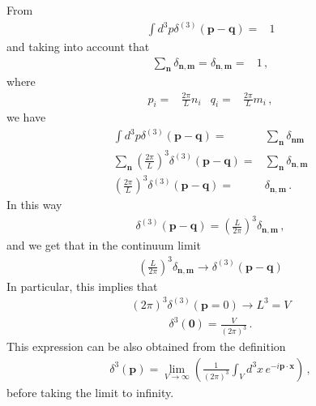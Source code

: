\begin{frame}
From
\begin{align}
  \int d^3p \delta^{(3)}(\mathbf{p}-\mathbf{q})=&1
\end{align}
and taking into account that
\begin{align}
  \sum_{\mathbf{n}} \delta_{\mathbf{n}, \mathbf{m}}=\delta_{\mathbf{n}, \mathbf{m}}=&1\,,
\end{align}
where
\begin{align}
  p_i=&\frac{2\pi}{L}n_i & q_i=&\frac{2\pi}{L}m_i\,,
\end{align}
we have
\begin{align}
  \int d^3p \delta^{(3)}(\mathbf{p}-\mathbf{q})=&\sum_{\mathbf{n}} \delta_{\mathbf{n}\mathbf{m}}\nonumber\\
 \sum_{\mathbf{n}} \left(\frac{2\pi}{L}\right)^3\delta^{(3)}(\mathbf{p}-\mathbf{q})=&\sum_{\mathbf{n}} \delta_{\mathbf{n}, \mathbf{m}}\nonumber\\
  \left(\frac{2\pi}{L}\right)^3\delta^{(3)}(\mathbf{p}-\mathbf{q})=& \delta_{\mathbf{n}, \mathbf{m}}\,.
\end{align}
In this way
\begin{align}
  \delta^{(3)}(\mathbf{p}-\mathbf{q})=\left(\frac{L}{2\pi}\right)^3\delta_{\mathbf{n},\mathbf{m}}\,,
\end{align}
and we get that in the continuum limit
\begin{align}
  \label{eq:24}
\left(\frac{L}{2\pi}\right)^3\delta_{\mathbf{n},\mathbf{m}}\to  \delta^{(3)}(\mathbf{p}-\mathbf{q})
\end{align}
In particular, this implies that
\begin{align}
  \label{eq:25}
  (2\pi)^3\delta^{(3)}(\mathbf{p}=0)\to L^3=V
\end{align}
\begin{align}
\label{eq:26f}
  \delta^3(\mathbf{0})=\frac{V}{(2\pi)^3}\,.
\end{align}
This expression can be also obtained from the definition
\begin{align}
  \delta^3(\mathbf{p})=\lim_{V\to\infty}\left(\frac{1}{(2\pi)^3}\int_V d^3x\, e^{-i\mathbf{p}\cdot\mathbf{x} }\right)\,,
\end{align}
before taking the limit to infinity.




\end{frame}
